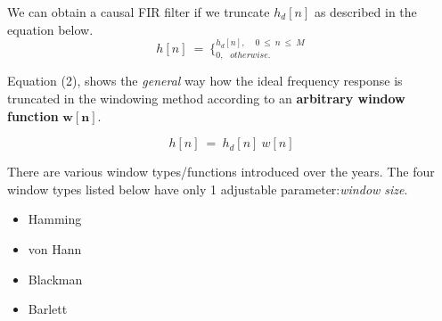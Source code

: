 \documentclass[11pt]{article}
\begin{document}
We can obtain a causal FIR filter if we truncate $h_{d}[n]$ as described in the equation below.
$$h[ n] \ =\ \bigl\{^{h_{d}[ n] ,\ \ \ \ \ 0\ \leqslant \ n\ \leqslant \ M\ }_{0,\ \ \ otherwise.\ }$$

Equation (2), shows the {\it general} way how the ideal frequency response is truncated in the windowing method according to an {\bf arbitrary window function} $\mathbf{w[n]}.$

\begin{equation}
    h[ n] \ =\ h_{d}[ n] \ w[ n]
\end{equation}

There are various window types/functions introduced over the years. The four window types listed below have only 1 adjustable parameter:{\it window size}.
\begin{itemize}
	\item Hamming
	\item von Hann
	\item Blackman
	\item Barlett
\end{itemize}
\end{document}
